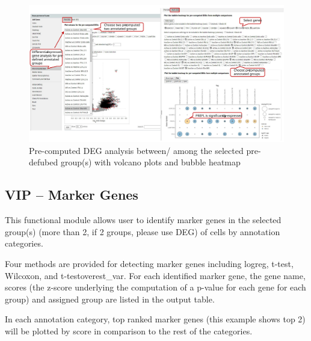 \documentclass[
]{article}
\begin{document}
\begin{figure}
\centering
\includegraphics{figures/F28_label.svg}
\caption{Pre-computed DEG analysis between/ among the selected pre-defubed group(s) with volcano plots and bubble heatmap}
\end{figure}

\hypertarget{vip-marker-genes}{%
\subsection{VIP -- Marker Genes}\label{vip-marker-genes}}

This functional module allows user to identify marker genes in the selected group(s) (more than 2, if 2 groups, please use DEG) of cells by annotation categories.

Four methods are provided for detecting marker genes including logreg, t-test, Wilcoxon, and t-testoverest\_var. For each identified marker gene, the gene name, scores (the z-score underlying the computation of a p-value for each gene for each group) and assigned group are listed in the output table.

In each annotation category, top ranked marker genes (this example shows top 2) will be plotted by score in comparison to the rest of the categories.
\end{document}

